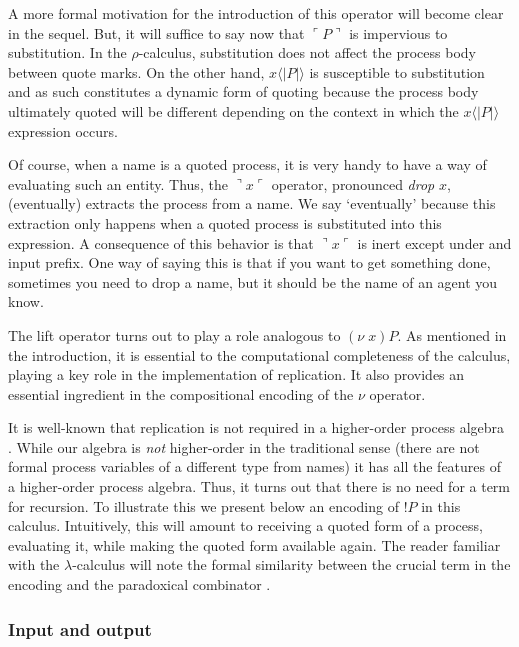 \documentclass[]{entcs}
\newcommand{\lliftb}{\langle\!|}
\newcommand{\rliftb}{|\!\rangle}
\newcommand{\lpquote}{\ulcorner}
\newcommand{\rpquote}{\urcorner}
\newcommand{\lift}[2]{#1 \lliftb #2 \rliftb}
\newcommand{\quotep}[1]{\lpquote #1 \rpquote}
\newcommand{\dropn}[1]{\rpquote #1 \lpquote}
\begin{document}
A more formal motivation for the introduction of this operator will
become clear in the sequel. But, it will suffice to say now that
$\quotep{P}$ is impervious to substitution. In the $\rho$-calculus,
substitution does not affect the process body between quote marks. On
the other hand, $\lift{x}{P}$ is susceptible to substitution and as
such constitutes a dynamic form of quoting because the process body
ultimately quoted will be different depending on the context in which
the $\lift{x}{P}$ expression occurs.

Of course, when a name is a quoted process, it is very handy to have a
way of evaluating such an entity. Thus, the $\dropn{x}$ operator,
pronounced \textit{drop} $x$, (eventually) extracts the process from a
name. We say `eventually' because this extraction only happens when a
quoted process is substituted into this expression. A consequence of
this behavior is that $\dropn{x}$ is inert except under and input
prefix. One way of saying this is that if you want to get something
done, sometimes you need to drop a name, but it should be the name of
an agent you know.

\begin{remark} %
The lift operator turns out to play a role analogous to $(\nu \;
x)P$. As mentioned in the introduction, it is essential to the
computational completeness of the calculus, playing a key role in the
implementation of replication. It also provides an essential
ingredient in the compositional encoding of the $\nu$ operator.
\end{remark}

\begin{remark} %
It is well-known that replication is not required in a higher-order
process algebra \cite{SangiorgiWalker}. While our algebra is
\textit{not} higher-order in the traditional sense (there are not
formal process variables of a different type from names) it has all
the features of a higher-order process algebra. Thus, it turns out
that there is no need for a term for recursion. To illustrate this we
present below an encoding of $!P$ in this calculus. Intuitively, this
will amount to receiving a quoted form of a process, evaluating it,
while making the quoted form available again. The reader familiar with
the $\lambda$-calculus will note the formal similarity between the
crucial term in the encoding and the paradoxical combinator
\cite{Barendregt84}.
\end{remark}

\subsubsection{Input and output}
\end{document}
